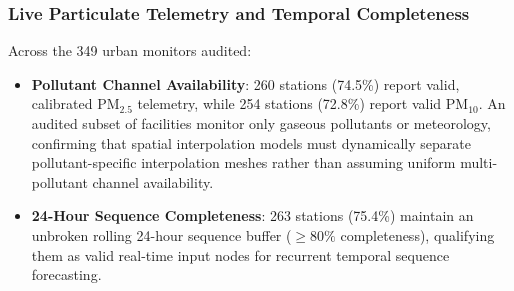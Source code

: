 \documentclass[conference]{IEEEtran}
\begin{document}


\subsubsection{Live Particulate Telemetry and Temporal Completeness}
Across the 349 urban monitors audited:
\begin{itemize}
    \item \textbf{Pollutant Channel Availability}: 260 stations (74.5\%) report valid, calibrated $\text{PM}_{2.5}$ telemetry, while 254 stations (72.8\%) report valid $\text{PM}_{10}$. An audited subset of facilities monitor only gaseous pollutants or meteorology, confirming that spatial interpolation models must dynamically separate pollutant-specific interpolation meshes rather than assuming uniform multi-pollutant channel availability.
    \item \textbf{24-Hour Sequence Completeness}: 263 stations (75.4\%) maintain an unbroken rolling 24-hour sequence buffer ($\ge 80\%$ completeness), qualifying them as valid real-time input nodes for recurrent temporal sequence forecasting.
\end{itemize}
\end{document}
